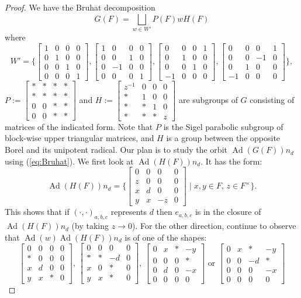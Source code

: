 \documentclass[11pt]{amsart}
\theoremstyle{remark}
\newcommand{\ra}{\rightarrow}
\newcommand{\Ad}{\operatorname{Ad}}
\newcommand{\matr}[1]{\left[\begin{matrix}#1\end{matrix}\right]}
\begin{document}
\iffalse
\begin{proof} We have the Bruhat decomposition
	\begin{equation}\label{eq:Bruhat}
	G(F)=\bigsqcup_{w\in W'}P(F)wH(F)
	\end{equation}
	where 
	\[
	W'=\{\matr{1&0&0&0\\0&1&0&0\\0&0&1&0\\0&0&0&1},\matr{1&0&0&0\\0&0&1&0\\0&-1&0&0\\0&0&0&1},\matr{0&0&0&1\\0&1&0&0\\0&0&1&0\\-1&0&0&0},\matr{0&0&0&1\\0&0&-1&0\\0&1&0&0\\-1&0&0&0}\},
	\]
	$P:=\matr{*&*&*&*\\ *&*&*&*\\ 0&0&*&*\\ 0&0&*&*}$ and  $H:=\matr{z^{-1}&0&0&0\\ *&1&0&0\\ *&*&1&0\\ *&*&*&z}$ are subgroups of $G$ consisting of matrices of the indicated form. Note that $P$ is the Sigel parabolic subgroup of block-wise upper triangular matrices, and $H$ is a group between the opposite Borel and its unipotent radical. Our plan is to study the orbit $\Ad(G(F))n_d$ using (\ref{eq:Bruhat}). We first look at $\Ad(H(F))n_d$. It has the form:
	\[
	\Ad(H(F))n_d=\{\matr{0&0&0&0\\ z&0&0&0\\x&d&0&0\\y&x&-z&0}\;|\;x,y\in F,\,z\in F^{\times}\}.
	\]
	This shows that if $(\cdot,\cdot)_{a,b,c}$ represents $d$ then $e_{a,b,c}$ is in the closure of $\Ad(H(F))n_d$ (by taking $z\ra 0$). For the other direction, continue to observe that $\Ad(w)\Ad(H(F))n_d$ is of one of the shapes:
	\[
	\matr{0&0&0&0\\ *&0&0&0\\x&d&0&0\\y&x&*&0}\text{, }\matr{0&0&0&0\\ *&*&-d&0\\x&0&*&0\\y&x&*&0}\text{, }\matr{0&x&*&-y\\ 0&0&0&*\\0&d&0&-x\\0&0&0&0}\text{ or }\matr{0&x&*&-y\\ 0&0&-d&*\\0&0&0&-x\\0&0&0&0}
\]
\end{proof}
\end{document}
